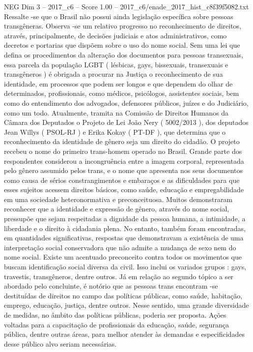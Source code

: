 \begin{textsample}{NEG Dim 3 – 2017\_c6 – Score 1.00 – 2017\_c6/enade\_2017\_hist\_c8f39f5082.txt}
Ressalte -se que o Brasil não possui ainda legislação específica sobre pessoas transgêneras.
Observa -se um relativo progresso no reconhecimento de direitos, através, principalmente, de decisões judiciais e atos administrativos, como decretos e portarias que dispõem sobre o uso do nome social.
Sem uma lei que defina os procedimentos da alteração dos documentos para pessoas transexuais, essa parcela da população LGBT ( lésbicas, gays, bissexuais, transexuais e transgêneros ) é obrigada a procurar na Justiça o reconhecimento de sua identidade, em processos que podem ser longos e que dependem do olhar de determinados, profissionais, como médicos, psicólogos, assistentes sociais, bem como do entendimento dos advogados, defensores públicos, juízes e do Judiciário, como um todo.
Atualmente, tramita na Comissão de Direitos Humanos da Câmara dos Deputados o Projeto de Lei João Nery ( 5002/2013 ), dos deputados Jean Willys ( PSOL-RJ ) e Erika Kokay ( PT-DF ), que determina que o reconhecimento da identidade de gênero seja um direito do cidadão.
O projeto recebeu o nome do primeiro trans-homem operado no Brasil.
Grande parte dos respondentes considerou a incongruência entre a imagem corporal, representada pelo gênero assumido pelos trans, e o nome que apresenta nos seus documentos como causa de sérios constrangimentos e embaraços e as dificuldades para que esses sujeitos acessem direitos básicos, como saúde, educação e empregabilidade em uma sociedade heteronormativa e preconceituosa.
Muitos demonstraram reconhecer que a identidade e expressão de gênero, através do nome social, pressupõe que sejam respeitadas a dignidade da pessoa humana, a intimidade, a liberdade e o direito à cidadania plena.
No entanto, também foram encontradas, em quantidades significativas, respostas que demonstravam a existência de uma interpretação social conservadora que não admite a mudança de sexo nem do nome social.
Existe um acentuado preconceito contra todos os movimentos que buscam identificação social diversa da civil.
Isso inclui os variados grupos : gays, travestis, transgêneros, dentre outros.
Já em relação ao segundo tópico a ser abordado pelo concluinte, é notório que as pessoas trans encontram -se destituídas de direitos no campo das políticas públicas, como saúde, habitação, emprego, educação, justiça, dentre outros.
Nesse sentido, uma grande diversidade de medidas, no âmbito das políticas públicas, poderia ser proposta.
Ações voltadas para a capacitação de profissionais da educação, saúde, segurança pública, dentre outras áreas, para melhor atender às demandas e especificidades desse público alvo seriam necessárias.

\end{textsample}
